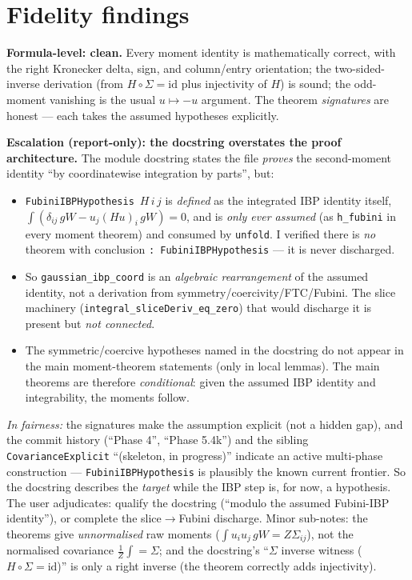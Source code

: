 \documentclass[11pt]{article}
\begin{document}
\section{Fidelity findings}
\textbf{Formula-level: clean.} Every moment identity is mathematically correct, with the right Kronecker
delta, sign, and column/entry orientation; the two-sided-inverse derivation (from $H\circ\Sigma=\mathrm{id}$
plus injectivity of $H$) is sound; the odd-moment vanishing is the usual $u\mapsto-u$ argument. The
theorem \emph{signatures} are honest --- each takes the assumed hypotheses explicitly.

\textbf{Escalation (report-only): the docstring overstates the proof architecture.} The module docstring
states the file \emph{proves} the second-moment identity ``by coordinatewise integration by parts'', but:
\begin{itemize}[nosep]
  \item \texttt{FubiniIBPHypothesis}~$H\,i\,j$ is \emph{defined} as the integrated IBP identity itself,
    $\int(\delta_{ij}\,gW - u_j(Hu)_i\,gW)=0$, and is \emph{only ever assumed} (as \texttt{h\_fubini} in
    every moment theorem) and consumed by \texttt{unfold}. I verified there is \emph{no} theorem with
    conclusion \texttt{: FubiniIBPHypothesis} --- it is never discharged.
  \item So \texttt{gaussian\_ibp\_coord} is an \emph{algebraic rearrangement} of the assumed identity,
    not a derivation from symmetry/coercivity/FTC/Fubini. The slice machinery
    (\texttt{integral\_sliceDeriv\_eq\_zero}) that would discharge it is present but \emph{not connected}.
  \item The symmetric/coercive hypotheses named in the docstring do not appear in the main moment-theorem
    statements (only in local lemmas). The main theorems are therefore \emph{conditional}: given the
    assumed IBP identity and integrability, the moments follow.
\end{itemize}
\emph{In fairness:} the signatures make the assumption explicit (not a hidden gap), and the commit history
(``Phase 4'', ``Phase 5.4k'') and the sibling \texttt{CovarianceExplicit} ``(skeleton, in progress)''
indicate an active multi-phase construction --- \texttt{FubiniIBPHypothesis} is plausibly the known current
frontier. So the docstring describes the \emph{target} while the IBP step is, for now, a hypothesis. The
user adjudicates: qualify the docstring (``modulo the assumed Fubini-IBP identity''), or complete the
slice$\to$Fubini discharge. Minor sub-notes: the theorems give \emph{unnormalised} raw moments
($\int u_iu_j\,gW=Z\Sigma_{ij}$), not the normalised covariance $\tfrac1Z\int=\Sigma$; and the docstring's
``$\Sigma$ inverse witness ($H\circ\Sigma=\mathrm{id}$)'' is only a right inverse (the theorem correctly
adds injectivity).
\end{document}
